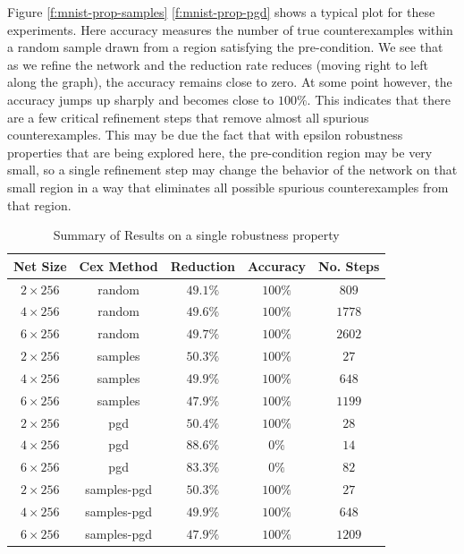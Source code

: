 Figure \ref{f:mnist-prop-samples} \ref{f:mnist-prop-pgd} shows a typical plot
for these experiments.  Here accuracy measures the number of true
counterexamples within a random sample
drawn from a region satisfying the pre-condition.  We see that as we refine the
network and the reduction rate reduces (moving right to left along the graph),
the accuracy remains close to zero. At some point however, the accuracy jumps up
sharply and becomes close to $100\%$. This indicates that there are a few
critical refinement steps that remove almost all spurious counterexamples. This
may be due the fact that with epsilon robustness properties that are being
explored here, the pre-condition region may be very small, so a single
refinement step may change the behavior of the network on that small region in a
way that eliminates all possible spurious counterexamples from that region.
 

\begin{table}
\begin{tabular}{|c|c|c|c|c|}
    \hline
    Net Size     & Cex Method  & Reduction & Accuracy & No. Steps \\
    \hline
    $2\times256$ & random      & $49.1\%$  & $100\%$  & $ 809$    \\
    $4\times256$ & random      & $49.6\%$  & $100\%$  & $1778$    \\
    $6\times256$ & random      & $49.7\%$  & $100\%$  & $2602$    \\
    $2\times256$ & samples     & $50.3\%$  & $100\%$  & $  27$    \\
    $4\times256$ & samples     & $49.9\%$  & $100\%$  & $ 648$    \\
    $6\times256$ & samples     & $47.9\%$  & $100\%$  & $1199$    \\
    $2\times256$ & pgd         & $50.4\%$  & $100\%$  & $  28$    \\
    $4\times256$ & pgd         & $88.6\%$  & $  0\%$  & $  14$    \\
    $6\times256$ & pgd         & $83.3\%$  & $  0\%$  & $  82$    \\
    $2\times256$ & samples-pgd & $50.3\%$  & $100\%$  & $  27$    \\
    $4\times256$ & samples-pgd & $49.9\%$  & $100\%$  & $ 648$    \\
    $6\times256$ & samples-pgd & $47.9\%$  & $100\%$  & $1209$    \\
    \hline
\end{tabular}
\caption{Summary of \mnist Results on a single robustness property  }
\label{t:mnist-prop-summary}
\end{table}

